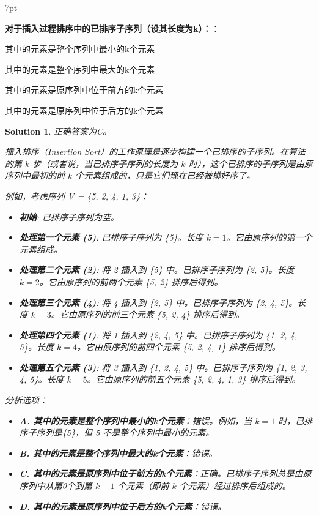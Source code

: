 \documentclass[UTF8]{report}
\newtheorem{solution}{Solution}
\theoremstyle{MyLineTheoremStyle} %
\theoremstyle{MyBlockTheoremStyle} %
\theoremstyle{MySubsubsectionStyle} %
\newenvironment{graybox}{%
        \def\FrameCommand{%
        \hspace{1pt}%
        {\color{gray}\small \vrule width 2pt}%
        {\color{graybox_color}\vrule width 4pt}%
        \colorbox{graybox_color}%
        }%
        \MakeFramed{\advance\hsize-\width\FrameRestore}%
        \noindent\hspace{-4.55pt}%
        \begin{adjustwidth}{}{7pt}%
        \vspace{2pt}\vspace{2pt}%
        }
        {%
        \vspace{2pt}\end{adjustwidth}\endMakeFramed%
        }
\begin{document}
\begin{graybox}
\textbf{对于插入过程排序中的已排序子序列（设其长度为k）：}：
\begin{circledenum}
    \item 其中的元素是整个序列中最小的k个元素
    \item 其中的元素是整个序列中最大的k个元素
    \item 其中的元素是原序列中位于前方的k个元素
    \item 其中的元素是原序列中位于后方的k个元素
\end{circledenum}
\end{graybox}

\begin{solution}
正确答案为C。

插入排序（Insertion Sort）的工作原理是逐步构建一个已排序的子序列。在算法的第 $k$ 步（或者说，当已排序子序列的长度为 $k$ 时），这个已排序的子序列是由原序列中最初的前 $k$ 个元素组成的，只是它们现在已经被排好序了。

例如，考虑序列 V = \{5, 2, 4, 1, 3\}：
\begin{itemize}
    \item \textbf{初始}: 已排序子序列为空。
    \item \textbf{处理第一个元素 (5)}: 已排序子序列为 \{5\}。长度 $k=1$。它由原序列的第一个元素组成。
    \item \textbf{处理第二个元素 (2)}: 将 2 插入到 \{5\} 中。已排序子序列为 \{2, 5\}。长度 $k=2$。它由原序列的前两个元素 \{5, 2\} 排序后得到。
    \item \textbf{处理第三个元素 (4)}: 将 4 插入到 \{2, 5\} 中。已排序子序列为 \{2, 4, 5\}。长度 $k=3$。它由原序列的前三个元素 \{5, 2, 4\} 排序后得到。
    \item \textbf{处理第四个元素 (1)}: 将 1 插入到 \{2, 4, 5\} 中。已排序子序列为 \{1, 2, 4, 5\}。长度 $k=4$。它由原序列的前四个元素 \{5, 2, 4, 1\} 排序后得到。
    \item \textbf{处理第五个元素 (3)}: 将 3 插入到 \{1, 2, 4, 5\} 中。已排序子序列为 \{1, 2, 3, 4, 5\}。长度 $k=5$。它由原序列的前五个元素 \{5, 2, 4, 1, 3\} 排序后得到。
\end{itemize}

分析选项：
\begin{itemize}
    \item \textbf{A. 其中的元素是整个序列中最小的k个元素}：错误。例如，当 $k=1$ 时，已排序子序列是\{5\}，但 5 不是整个序列中最小的元素。
    \item \textbf{B. 其中的元素是整个序列中最大的k个元素}：错误。
    \item \textbf{C. 其中的元素是原序列中位于前方的k个元素}：正确。已排序子序列总是由原序列中从第0个到第 $k-1$ 个元素（即前 $k$ 个元素）经过排序后组成的。
    \item \textbf{D. 其中的元素是原序列中位于后方的k个元素}：错误。
\end{itemize}
\end{solution}
\end{document}
